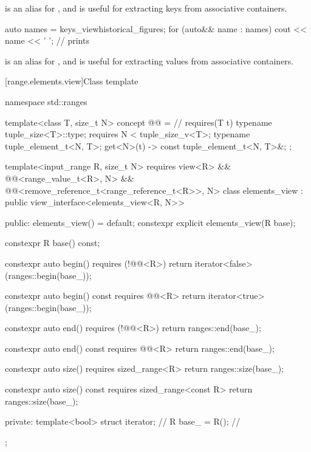 \pnum
{} is an alias for , and
is useful for extracting keys from associative containers.

\begin{example}
\begin{codeblock}
auto names = keys_view{historical_figures};
for (auto&& name : names) {
  cout << name << ' ';          // prints 
}
\end{codeblock}
\end{example}

\pnum
{} is an alias for , and
is useful for extracting values from associative containers.

\begin{example}
\end{example}

[range.elements.view]{Class template }

%
\begin{codeblock}
namespace std::ranges {
  template<class T, size_t N>
  concept @@ =                   // \expos
    requires(T t) {
      typename tuple_size<T>::type;
      requires N < tuple_size_v<T>;
      typename tuple_element_t<N, T>;
      { get<N>(t) } -> const tuple_element_t<N, T>&;
    };


  template<input_range R, size_t N>
    requires view<R> && @@<range_value_t<R>, N> &&
      @@<remove_reference_t<range_reference_t<R>>, N>
  class elements_view : public view_interface<elements_view<R, N>> {
  public:
    elements_view() = default;
    constexpr explicit elements_view(R base);

    constexpr R base() const;

    constexpr auto begin() requires (!@@<R>)
    { return iterator<false>(ranges::begin(base_)); }

    constexpr auto begin() const requires @@<R>
    { return iterator<true>(ranges::begin(base_)); }

    constexpr auto end() requires (!@@<R>)
    { return ranges::end(base_); }

    constexpr auto end() const requires @@<R>
    { return ranges::end(base_); }

    constexpr auto size() requires sized_range<R>
    { return ranges::size(base_); }

    constexpr auto size() const requires sized_range<const R>
    { return ranges::size(base_); }

  private:
    template<bool> struct iterator;                     // \expos
    R base_ = R();                                      // \expos
  };
}
\end{codeblock}

